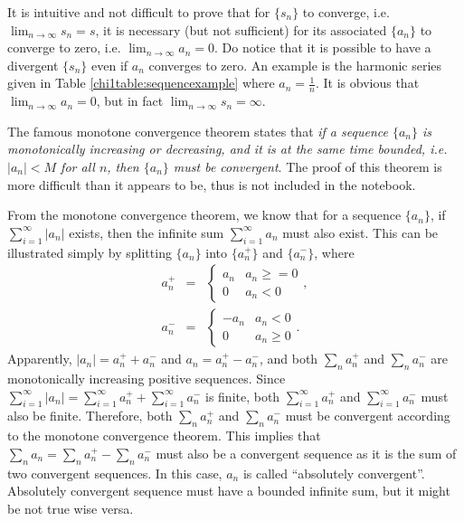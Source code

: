 It is intuitive and not difficult to prove that for $\{s_n\}$ to converge, i.e. $\lim_{n\rightarrow\infty}s_n = s$, it is necessary (but not sufficient) for its associated $\{a_n\}$ to converge to zero, i.e. $\lim_{n\rightarrow\infty}a_n = 0$. Do notice that it is possible to have a divergent $\{s_n\}$ even if $a_n$ converges to zero. An example is the harmonic series given in Table \ref{chi1table:sequencexample} where $a_n = \frac{1}{n}$. It is obvious that $\lim_{n\rightarrow\infty}a_n=0$, but in fact $\lim_{n\rightarrow\infty}s_n=\infty$.

The famous monotone convergence theorem states that \textit{if a sequence $\{a_n\}$ is monotonically increasing or decreasing, and it is at the same time bounded, i.e. $|a_n| < M$ for all $n$, then $\{a_n\}$ must be convergent}. The proof of this theorem is more difficult than it appears to be, thus is not included in the notebook.

From the monotone convergence theorem, we know that for a sequence $\{a_n\}$, if $\sum_{i=1}^{\infty}|a_n|$ exists, then the infinite sum $\sum_{i=1}^{\infty}a_n$ must also exist. This can be illustrated simply by splitting $\{a_n\}$ into $\{a_n^+\}$ and $\{a_n^-\}$, where
\begin{eqnarray}
  a_n^+ &=& \left\{\begin{array}{cc}
                     a_n & a_n \geq = 0 \\
                     0 & a_n < 0
                   \end{array}\right.,  \nonumber \\
  a_n^- &=& \left\{\begin{array}{cc}
                     -a_n & a_n < 0 \\
                     0 & a_n \geq 0
                   \end{array}\right.. \nonumber
\end{eqnarray}
Apparently, $|a_n| = a_n^+ + a_n^-$ and $a_n = a_n^+ - a_n^-$, and both $\sum_na_n^+$ and $\sum_na_n^-$ are monotonically increasing positive sequences. Since $\sum_{i=1}^{\infty}|a_n| = \sum_{i=1}^{\infty}a_n^+ + \sum_{i=1}^{\infty}a_n^-$ is finite, both $\sum_{i=1}^{\infty}a_n^+$ and $\sum_{i=1}^{\infty}a_n^-$ must also be finite. Therefore, both $\sum_na_n^+$ and $\sum_na_n^-$ must be convergent according to the monotone convergence theorem. This implies that $\sum_n a_n = \sum_n a_n^+ - \sum_n a_n^-$ must also be a convergent sequence as it is the sum of two convergent sequences. In this case, $a_n$ is called ``absolutely convergent''. Absolutely convergent sequence must have a bounded infinite sum, but it might be not true wise versa.

